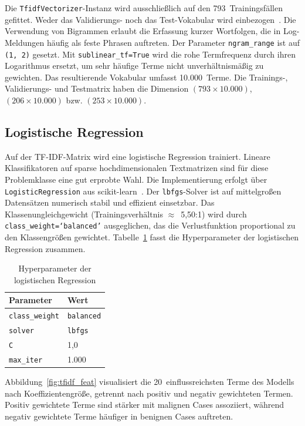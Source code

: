 Die \texttt{TfidfVectorizer}-Instanz wird ausschließlich auf den 793~Trainingsfällen gefittet. Weder das Validierungs- noch das Test-Vokabular wird einbezogen~\cite{kaufman2012leakage}. Die Verwendung von Bigrammen erlaubt die Erfassung kurzer Wortfolgen, die in Log-Meldungen häufig als feste Phrasen auftreten. Der Parameter \texttt{ngram\_range} ist auf \texttt{(1,\,2)} gesetzt. Mit \texttt{sublinear\_tf=True} wird die rohe Termfrequenz durch ihren Logarithmus ersetzt, um sehr häufige Terme nicht unverhältnismäßig zu gewichten. Das resultierende Vokabular umfasst 10.000~Terme. Die Trainings-, Validierungs- und Testmatrix haben die Dimension $(793 \times 10.000)$, $(206 \times 10.000)$ bzw. $(253 \times 10.000)$.

\subsection{Logistische Regression}

Auf der TF-IDF-Matrix wird eine logistische Regression trainiert. Lineare Klassifikatoren auf sparse hochdimensionalen Textmatrizen sind für diese Problemklasse eine gut erprobte Wahl. Die Implementierung erfolgt über \texttt{LogisticRegression} aus scikit-learn~\cite{pedregosa2011scikit}. Der \texttt{lbfgs}-Solver ist auf mittelgroßen Datensätzen numerisch stabil und effizient einsetzbar. Das Klassenungleichgewicht (Trainingsverhältnis $\approx$~5{,}50:1) wird durch \texttt{class\_weight=`balanced'} ausgeglichen, das die Verlustfunktion proportional zu den Klassengrößen gewichtet. Tabelle~\ref{tab:logreg_params} fasst die Hyperparameter der logistischen Regression zusammen.

\begin{table}[H]
  \centering
  \caption{Hyperparameter der logistischen Regression}
  \label{tab:logreg_params}
  \begin{tabular}{ll}
    \hline
    \textbf{Parameter} & \textbf{Wert} \\
    \hline
    \texttt{class\_weight} & \texttt{balanced} \\
    \texttt{solver}        & \texttt{lbfgs} \\
    \texttt{C}             & 1{,}0 \\
    \texttt{max\_iter}     & 1.000 \\
    \hline
  \end{tabular}
\end{table}

Abbildung~\ref{fig:tfidf_feat} visualisiert die 20~einflussreichsten Terme des Modells nach Koeffizientengröße, getrennt nach positiv und negativ gewichteten Termen. Positiv gewichtete Terme sind stärker mit malignen Cases assoziiert, während negativ gewichtete Terme häufiger in benignen Cases auftreten.

